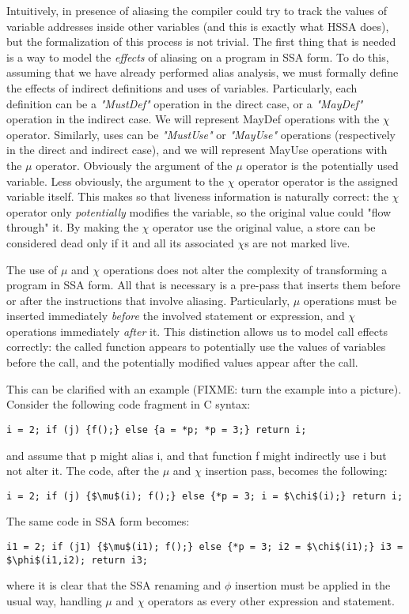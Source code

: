 Intuitively, in presence of aliasing the compiler could try to track the values of variable addresses inside other variables (and this is exactly what HSSA does), but the formalization of this process is not trivial.
The first thing that is needed is a way to model the {\em effects} of aliasing on a program in SSA form.
To do this, assuming that we have already performed alias analysis, we must formally define the effects of indirect definitions and uses of variables.
Particularly, each definition can be a {\em "MustDef"} operation in the direct case, or a {\em "MayDef"} operation in the indirect case. We will represent MayDef operations with the $\chi$ operator.
Similarly, uses can be {\em "MustUse"} or {\em "MayUse"} operations (respectively in the direct and indirect case), and we will represent MayUse operations with the $\mu$ operator.
Obviously the argument of the $\mu$ operator is the potentially used variable.
Less obviously, the argument to the $\chi$ operator operator is the assigned variable itself. This makes so that liveness information is naturally correct: the $\chi$ operator only {\em potentially} modifies the variable, so the original value could "flow through" it. By making the $\chi$ operator use the original value, a store can be considered dead only if it and all its associated $\chi$s are not marked live.

The use of $\mu$ and $\chi$ operations does not alter the complexity of transforming a program in SSA form. All that is necessary is a pre-pass that inserts them before or after the instructions that involve aliasing. Particularly, $\mu$ operations must be inserted immediately {\em before} the involved statement or expression, and $\chi$ operations immediately {\em after} it. This distinction allows us to model call effects correctly: the called function appears to potentially use the values of variables before the call, and the potentially modified values appear after the call.

This can be clarified with an example (FIXME: turn the example into a picture).
Consider the following code fragment in C syntax:
\begin{verbatim}
i = 2; if (j) {f();} else {a = *p; *p = 3;} return i;
\end{verbatim}
and assume that p might alias i, and that function f might indirectly use i but not alter it.
The code, after the $\mu$ and $\chi$ insertion pass, becomes the following:
\begin{verbatim}
i = 2; if (j) {$\mu$(i); f();} else {*p = 3; i = $\chi$(i);} return i;
\end{verbatim}
The same code in SSA form becomes:
\begin{verbatim}
i1 = 2; if (j1) {$\mu$(i1); f();} else {*p = 3; i2 = $\chi$(i1);} i3 = $\phi$(i1,i2); return i3;
\end{verbatim}
where it is clear that the SSA renaming and $\phi$ insertion must be applied in the usual way, handling $\mu$ and $\chi$ operators as every other expression and statement.


